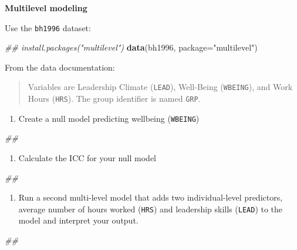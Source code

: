 \documentclass[
]{book}
\newenvironment{Shaded}{\begin{snugshade}}{\end{snugshade}}
\newcommand{\CommentTok}[1]{\textcolor[rgb]{0.56,0.35,0.01}{\textit{#1}}}
\newcommand{\DataTypeTok}[1]{\textcolor[rgb]{0.13,0.29,0.53}{#1}}
\newcommand{\KeywordTok}[1]{\textcolor[rgb]{0.13,0.29,0.53}{\textbf{#1}}}
\newcommand{\NormalTok}[1]{#1}
\newcommand{\StringTok}[1]{\textcolor[rgb]{0.31,0.60,0.02}{#1}}
\providecommand{\tightlist}{%
  \setlength{\itemsep}{0pt}\setlength{\parskip}{0pt}}
\begin{document}
\textbf{Multilevel modeling}

Use the \texttt{bh1996} dataset:

\begin{Shaded}
\begin{Highlighting}[]
\CommentTok{\#\# install.packages("multilevel")}
\KeywordTok{data}\NormalTok{(bh1996, }\DataTypeTok{package=}\StringTok{"multilevel"}\NormalTok{)}
\end{Highlighting}
\end{Shaded}

From the data documentation:

\begin{quote}
Variables are Leadership Climate (\texttt{LEAD}), Well-Being (\texttt{WBEING}), and Work Hours (\texttt{HRS}). The group identifier is named \texttt{GRP}.
\end{quote}

\begin{enumerate}
\def\labelenumi{\arabic{enumi}.}
\tightlist
\item
  Create a null model predicting wellbeing (\texttt{WBEING})
\end{enumerate}

\begin{Shaded}
\begin{Highlighting}[]
\CommentTok{\#\# }
\end{Highlighting}
\end{Shaded}

\begin{enumerate}
\def\labelenumi{\arabic{enumi}.}
\setcounter{enumi}{1}
\tightlist
\item
  Calculate the ICC for your null model
\end{enumerate}

\begin{Shaded}
\begin{Highlighting}[]
\CommentTok{\#\# }
\end{Highlighting}
\end{Shaded}

\begin{enumerate}
\def\labelenumi{\arabic{enumi}.}
\setcounter{enumi}{2}
\tightlist
\item
  Run a second multi-level model that adds two individual-level predictors, average number of hours worked (\texttt{HRS}) and leadership skills (\texttt{LEAD}) to the model and interpret your output.
\end{enumerate}

\begin{Shaded}
\begin{Highlighting}[]
\CommentTok{\#\# }
\end{Highlighting}
\end{Shaded}
\end{document}
